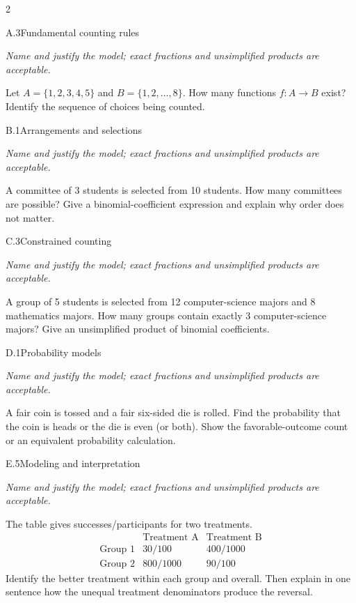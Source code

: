 \documentclass[9pt]{extarticle}
\begin{document}
\CoreWorkArea
\FormBreak
{}
\begin{multicols}{2}
\begin{CoreProblem}{A.3}{Fundamental counting rules}
{\scriptsize\textit{Name and justify the model; exact fractions and unsimplified products are acceptable.}\par}
Let $A=\{1,2,3,4,5\}$ and $B=\{1,2,\ldots,8\}$. How many functions
    $f:A\to B$ exist? Identify the sequence of choices being counted.
\end{CoreProblem}
\begin{CoreProblem}{B.1}{Arrangements and selections}
{\scriptsize\textit{Name and justify the model; exact fractions and unsimplified products are acceptable.}\par}
A committee of 3 students is selected from 10 students. How many
    committees are possible? Give a binomial-coefficient expression and explain
    why order does not matter.
\end{CoreProblem}
\begin{CoreProblem}{C.3}{Constrained counting}
{\scriptsize\textit{Name and justify the model; exact fractions and unsimplified products are acceptable.}\par}
A group of 5 students is selected from 12 computer-science majors and
    8 mathematics majors. How many groups contain exactly 3 computer-science
    majors? Give an unsimplified product of binomial coefficients.
\end{CoreProblem}
\columnbreak
\begin{CoreProblem}{D.1}{Probability models}
{\scriptsize\textit{Name and justify the model; exact fractions and unsimplified products are acceptable.}\par}
A fair coin is tossed and a fair six-sided die is rolled. Find the
    probability that the coin is heads or the die is even (or both). Show the
    favorable-outcome count or an equivalent probability calculation.
\end{CoreProblem}
\begin{CoreProblem}{E.5}{Modeling and interpretation}
{\scriptsize\textit{Name and justify the model; exact fractions and unsimplified products are acceptable.}\par}
The table gives successes/participants for two treatments.
    \[
    \begin{array}{c|cc}
      &\text{Treatment A}&\text{Treatment B}\\\hline
      \text{Group 1}&30/100&400/1000\\
      \text{Group 2}&800/1000&90/100
    \end{array}
    \]
    Identify the better treatment within each group and overall. Then explain in
    one sentence how the unequal treatment denominators produce the reversal.
\end{CoreProblem}
\end{multicols}
\end{document}

